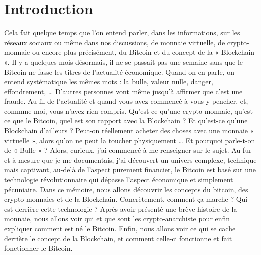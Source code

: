 \documentclass{bredele} %
\begin{document}
    \chapter*{Introduction}
    Cela fait quelque temps que l’on entend parler, dans les informations, sur les réseaux sociaux ou même dans nos discussions, de monnaie virtuelle, de crypto-monnaie ou encore plus précisément, du Bitcoin et du concept de la « Blockchain ».
    \newline
    \newline
    Il y a quelques mois désormais, il ne se passait pas une semaine sans que le Bitcoin ne fasse les titres de l’actualité économique. Quand on en parle, on entend systématique les mêmes mots : la bulle, valeur nulle, danger, effondrement, … D’autres personnes vont même jusqu’à affirmer que c’est une fraude.
    \newline
    Au fil de l’actualité et quand vous avez commencé à vous y pencher, et, commme moi, vous n’avez rien compris.
    \newline
    \newline
    Qu’est-ce qu’une crypto-monnaie, qu’est-ce que le Bitcoin, quel est son rapport avec la Blockchain ? Et qu’est-ce qu’une Blockchain d’ailleurs ? Peut-on réellement acheter des choses avec une monnaie « virtuelle », alors qu’on ne peut la toucher physiquement … Et pourquoi parle-t-on de « Bulle » ?
    \newline
    \newline
    Alors, curieux, j’ai commencé à me renseigner sur le sujet. Au fur et à mesure que je me documentais, j’ai découvert un univers complexe, technique mais captivant, au-delà de l’aspect purement financier, le Bitcoin est basé sur une technologie révolutionnaire qui dépasse l’aspect économique et simplement pécuniaire.
    \newline
    \newline
    Dans ce mémoire, nous allons découvrir les concepts du bitcoin, des crypto-monnaies et de la Blockchain. Concrètement, comment ça marche ? Qui est derrière cette technologie ?
    \newline
    \newline
    Après avoir présenté une brève histoire de la monnaie, nous allons voir qui et que sont les crypto-anarchiste pour enfin expliquer comment est né le Bitcoin. Enfin, nous allons voir ce qui se cache derrière le concept de la Blockchain, et comment celle-ci fonctionne et fait fonctionner le Bitcoin.
\end{document}
